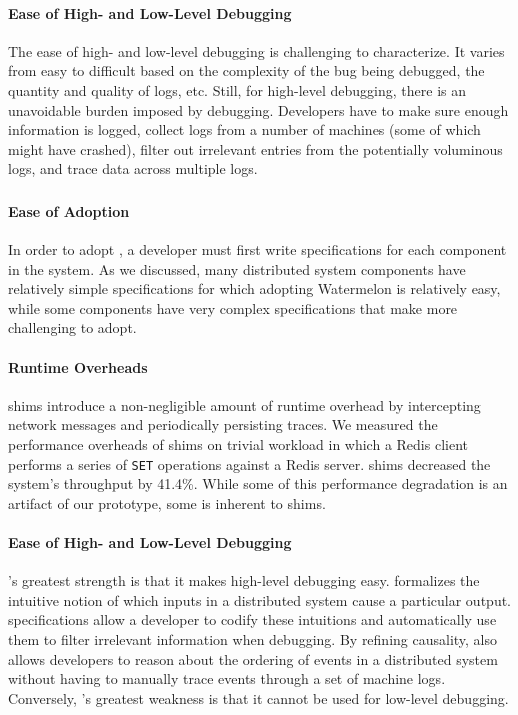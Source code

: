 \paragraph{Ease of High- and Low-Level Debugging}
The ease of high- and low-level \printf{} debugging is challenging to
characterize. It varies from easy to difficult based on the complexity of the
bug being debugged, the quantity and quality of logs, etc. Still, for
high-level debugging, there is an unavoidable burden imposed by \printf{}
debugging. Developers have to make sure enough information is logged, collect
logs from a number of machines (some of which might have crashed), filter out
irrelevant entries from the potentially voluminous logs, and trace data across
multiple logs.

\subsubsection{\fluent{}}
\paragraph{Ease of Adoption}
In order to adopt \fluent{}, a developer must first write \watprovenance{}
specifications for each component in the system. As we discussed, many
distributed system components have relatively simple \watprovenance{}
specifications for which adopting Watermelon is relatively easy, while some
components have very complex \watprovenance{} specifications that make
\fluent{} more challenging to adopt.

\paragraph{Runtime Overheads}
\fluent{} shims introduce a non-negligible amount of runtime overhead by
intercepting network messages and periodically persisting traces. We measured
the performance overheads of \fluent{} shims on trivial workload in which a
Redis client performs a series of \texttt{SET} operations against a Redis
server. \fluent{} shims decreased the system's throughput by 41.4\%. While some
of this performance degradation is an artifact of our prototype, some is
inherent to shims.

\paragraph{Ease of High- and Low-Level Debugging}
\fluent{}'s greatest strength is that it makes high-level debugging easy.
\Watprovenance{} formalizes the intuitive notion of which inputs in a
distributed system cause a particular output. \Watprovenance{} specifications
allow a developer to codify these intuitions and automatically use them to
filter irrelevant information when debugging. By refining causality,
\watprovenance{} also allows developers to reason about the ordering of events
in a distributed system without having to manually trace events through a set
of machine logs. Conversely, \fluent{}'s greatest weakness is that it cannot be
used for low-level debugging.
